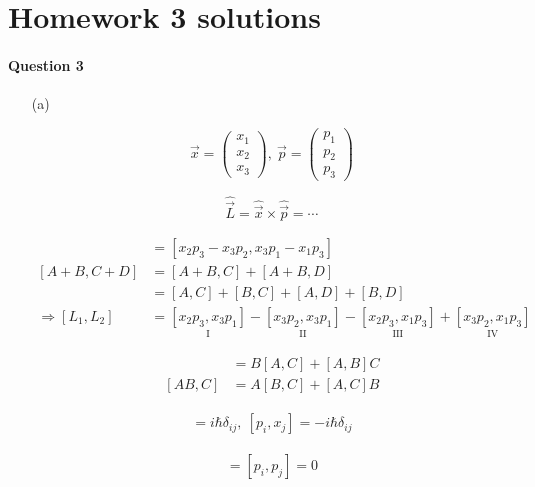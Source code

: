 \documentclass[11pt,a4paper]{article}
\author{Zehao Gao}
\begin{document}
\section*{Homework 3 solutions}

\paragraph*{Question 3}

\begin{enumerate}
\item[(a)]

\begin{equation}
    \vec{x}=
    \begin{pmatrix}
    x_1 \\
    x_2 \\
    x_3
    \end{pmatrix},\ 
    \vec{p}=
    \begin{pmatrix}
    p_1 \\
    p_2 \\
    p_3
    \end{pmatrix}
\end{equation}

\begin{equation}
    \hat{\vec{L}}=\hat{\vec{x}}\times\hat{\vec{p}}=\cdots
\end{equation}

\begin{align}
    [\hat{L}_1,\hat{L}_2]&=[x_2p_3-x_3p_2,x_3p_1-x_1p_3]\\
    [A+B,C+D]&=[A+B,C]+[A+B,D]\\
    &=[A,C]+[B,C]+[A,D]+[B,D]\\
    \Rightarrow
    [L_1,L_2]&=\underset{\mbox{I}}{[x_2p_3,x_3p_1]}-\underset{\mbox{II}}{[x_3p_2,x_3p_1]}-\underset{\mbox{III}}{[x_2p_3,x_1p_3]}+\underset{\mbox{IV}}{[x_3p_2,x_1p_3]}
\end{align}

\begin{align}
    [A,BC]&=B[A,C]+[A,B]C \\
    [AB,C]&=A[B,C]+[A,C]B
\end{align}

\begin{align}
    [x_i,p_j]=i\hbar\delta_{ij},\ [p_i,x_j]=-i\hbar\delta_{ij}
\end{align}

\begin{align}
    [x_i,x_j]=[p_i,p_j]=0
\end{align}


\end{enumerate}
\end{document}
